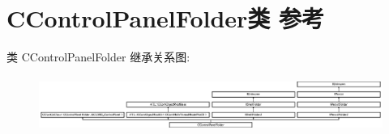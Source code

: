 \hypertarget{class_c_control_panel_folder}{}\section{C\+Control\+Panel\+Folder类 参考}
\label{class_c_control_panel_folder}
类 C\+Control\+Panel\+Folder 继承关系图\+:\begin{figure}[H]
\begin{center}
\leavevmode
\includegraphics[height=1.851852cm]{class_c_control_panel_folder}
\end{center}
\end{figure}
